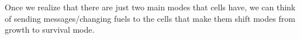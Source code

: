 Once we realize that there are just two main modes that cells have, we can think of sending messages/changing fuels to the cells that make them shift modes from growth to survival mode.